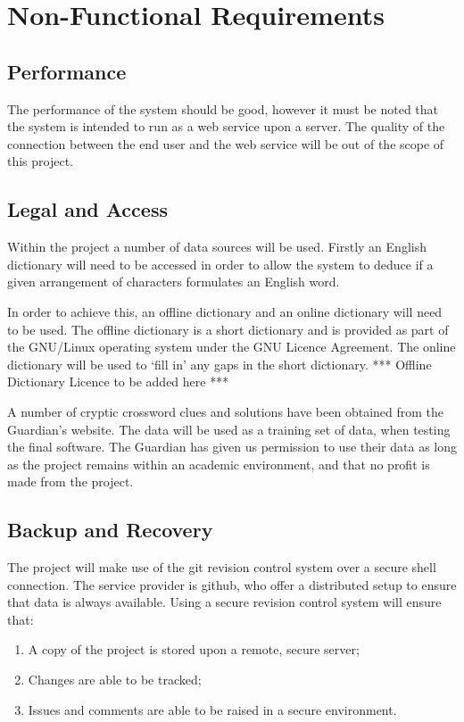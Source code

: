 \section{Non-Functional Requirements}


\subsection{Performance}

The performance of the system should be good, however it must be noted that the
system is intended to run as a web service upon a server. The quality of the 
connection between the end user and the web service will be out of the scope of
this project.


\subsection{Legal and Access}

Within the project a number of data sources will be used. Firstly an English
dictionary will need to be accessed in order to allow the system to deduce if a 
given arrangement of characters formulates an English word.

In order to achieve this, an offline dictionary and an online dictionary will
need to be used. The offline dictionary is a short dictionary and is provided as
part of the GNU/Linux operating system under the GNU Licence Agreement. The 
online dictionary will be used to `fill in' any gaps in the short dictionary.
*** Offline Dictionary Licence to be added here ***

A number of cryptic crossword clues and solutions have been obtained from the
Guardian's website. The data will be used as a training set of data, when
testing the final software. The Guardian has given us permission to use their
data as long as the project remains within an academic environment, and that no
profit is made from the project.


\subsection{Backup and Recovery}

The project will make use of the git revision control system over a secure shell 
connection. The service provider is github, who offer a distributed setup to 
ensure that data is always available. Using a secure revision control system 
will ensure that:

\begin{enumerate}
  \item A copy of the project is stored upon a remote, secure server;
  \item Changes are able to be tracked;
  \item Issues and comments are able to be raised in a secure environment.
\end{enumerate}

